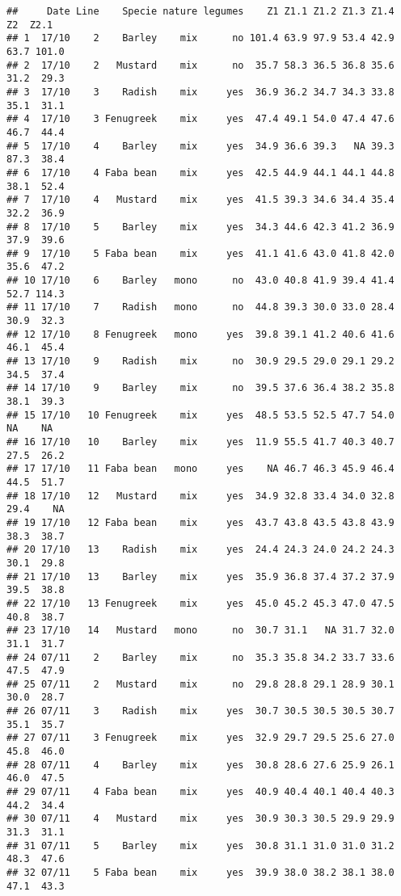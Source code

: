 \documentclass[
]{article}
\begin{document}
\begin{verbatim}
##     Date Line    Specie nature legumes    Z1 Z1.1 Z1.2 Z1.3 Z1.4   Z2  Z2.1
## 1  17/10    2    Barley    mix      no 101.4 63.9 97.9 53.4 42.9 63.7 101.0
## 2  17/10    2   Mustard    mix      no  35.7 58.3 36.5 36.8 35.6 31.2  29.3
## 3  17/10    3    Radish    mix     yes  36.9 36.2 34.7 34.3 33.8 35.1  31.1
## 4  17/10    3 Fenugreek    mix     yes  47.4 49.1 54.0 47.4 47.6 46.7  44.4
## 5  17/10    4    Barley    mix     yes  34.9 36.6 39.3   NA 39.3 87.3  38.4
## 6  17/10    4 Faba bean    mix     yes  42.5 44.9 44.1 44.1 44.8 38.1  52.4
## 7  17/10    4   Mustard    mix     yes  41.5 39.3 34.6 34.4 35.4 32.2  36.9
## 8  17/10    5    Barley    mix     yes  34.3 44.6 42.3 41.2 36.9 37.9  39.6
## 9  17/10    5 Faba bean    mix     yes  41.1 41.6 43.0 41.8 42.0 35.6  47.2
## 10 17/10    6    Barley   mono      no  43.0 40.8 41.9 39.4 41.4 52.7 114.3
## 11 17/10    7    Radish   mono      no  44.8 39.3 30.0 33.0 28.4 30.9  32.3
## 12 17/10    8 Fenugreek   mono     yes  39.8 39.1 41.2 40.6 41.6 46.1  45.4
## 13 17/10    9    Radish    mix      no  30.9 29.5 29.0 29.1 29.2 34.5  37.4
## 14 17/10    9    Barley    mix      no  39.5 37.6 36.4 38.2 35.8 38.1  39.3
## 15 17/10   10 Fenugreek    mix     yes  48.5 53.5 52.5 47.7 54.0   NA    NA
## 16 17/10   10    Barley    mix     yes  11.9 55.5 41.7 40.3 40.7 27.5  26.2
## 17 17/10   11 Faba bean   mono     yes    NA 46.7 46.3 45.9 46.4 44.5  51.7
## 18 17/10   12   Mustard    mix     yes  34.9 32.8 33.4 34.0 32.8 29.4    NA
## 19 17/10   12 Faba bean    mix     yes  43.7 43.8 43.5 43.8 43.9 38.3  38.7
## 20 17/10   13    Radish    mix     yes  24.4 24.3 24.0 24.2 24.3 30.1  29.8
## 21 17/10   13    Barley    mix     yes  35.9 36.8 37.4 37.2 37.9 39.5  38.8
## 22 17/10   13 Fenugreek    mix     yes  45.0 45.2 45.3 47.0 47.5 40.8  38.7
## 23 17/10   14   Mustard   mono      no  30.7 31.1   NA 31.7 32.0 31.1  31.7
## 24 07/11    2    Barley    mix      no  35.3 35.8 34.2 33.7 33.6 47.5  47.9
## 25 07/11    2   Mustard    mix      no  29.8 28.8 29.1 28.9 30.1 30.0  28.7
## 26 07/11    3    Radish    mix     yes  30.7 30.5 30.5 30.5 30.7 35.1  35.7
## 27 07/11    3 Fenugreek    mix     yes  32.9 29.7 29.5 25.6 27.0 45.8  46.0
## 28 07/11    4    Barley    mix     yes  30.8 28.6 27.6 25.9 26.1 46.0  47.5
## 29 07/11    4 Faba bean    mix     yes  40.9 40.4 40.1 40.4 40.3 44.2  34.4
## 30 07/11    4   Mustard    mix     yes  30.9 30.3 30.5 29.9 29.9 31.3  31.1
## 31 07/11    5    Barley    mix     yes  30.8 31.1 31.0 31.0 31.2 48.3  47.6
## 32 07/11    5 Faba bean    mix     yes  39.9 38.0 38.2 38.1 38.0 47.1  43.3

\end{verbatim}
\end{document}
